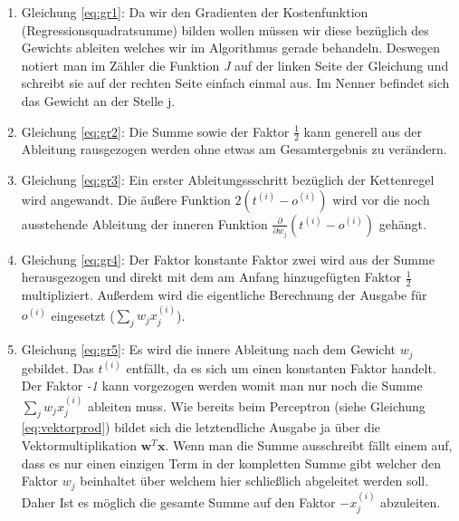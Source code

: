 \begin{enumerate}

\item Gleichung \ref{eq:gr1}: Da wir den Gradienten der Kostenfunktion (Regressionsquadratsumme) bilden wollen müssen wir diese bezüglich des Gewichts ableiten welches wir im Algorithmus gerade behandeln. Deswegen notiert man im Zähler die Funktion \emph{J} auf der linken Seite der Gleichung und schreibt sie auf der rechten Seite einfach einmal aus. Im Nenner befindet sich das Gewicht an der Stelle j. 

\item Gleichung \ref{eq:gr2}: Die Summe sowie der Faktor $\frac{1}{2}$ kann generell aus der Ableitung rausgezogen werden ohne etwas am Gesamtergebnis zu verändern. 

\item Gleichung \ref{eq:gr3}: Ein erster Ableitungssschritt bezüglich der Kettenregel wird angewandt. Die äußere Funktion $ 2 (t^{(i)} - o^{(i)}) $ wird vor die noch ausstehende Ableitung der inneren Funktion $  \frac{\partial}{\partial w_j} (t^{(i)} - o^{(i)}) $ gehängt. 

\item Gleichung \ref{eq:gr4}: Der Faktor konstante Faktor zwei wird aus der Summe herausgezogen und direkt mit dem am Anfang hinzugefügten Faktor $ \frac{1}{2} $ multipliziert. Außerdem wird die eigentliche Berechnung der Ausgabe für $ o^{(i)} $ eingesetzt ($\sum_j w_j x^{(i)}_{j}$). 

\item Gleichung \ref{eq:gr5}: Es wird die innere Ableitung nach dem Gewicht $w_j$ gebildet. Das $t^{(i)}$ entfällt, da es sich um einen konstanten Faktor handelt. Der Faktor \emph{-1} kann vorgezogen werden womit man nur noch die Summe $ \sum_j w_j x^{(i)}_{j} $ ableiten muss. Wie bereits beim Perceptron (siehe Gleichung \ref{eq:vektorprod}) bildet sich die letztendliche Ausgabe ja über die Vektormultiplikation ${\mathbf{w}^T\mathbf{x}}$. Wenn man die Summe ausschreibt fällt einem auf, dass es nur einen einzigen Term in der kompletten Summe gibt welcher den Faktor $w_j$ beinhaltet über welchem hier schließlich abgeleitet werden soll. Daher Ist es möglich die gesamte Summe auf den Faktor $-x^{(i)}_{j}$ abzuleiten. 

\end{enumerate}

